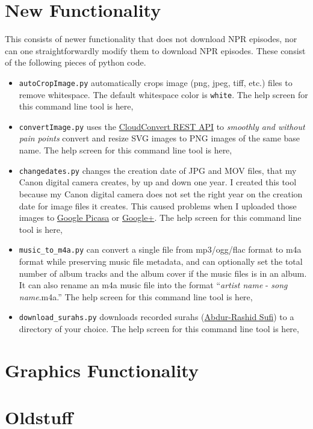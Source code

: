 \documentclass[]{article}
\begin{document}
\section{New Functionality}\label{sec:new_functionality}
This consists of newer functionality that does not download NPR episodes, nor can one straightforwardly modify them to download NPR episodes. These consist of the following pieces of python code.
\begin{itemize}
 \item {\verb|autoCropImage.py|} automatically crops image (png, jpeg, tiff, etc.) files to remove whitespace. The default whitespace color is {\verb|white|}. The help screen for this command line tool is here,
 
 
 \item {\verb|convertImage.py|} uses the \href{https://cloudconvert.com/apiconsole}{CloudConvert REST API} to \textit{smoothly and without pain points} convert and resize SVG images to PNG images of the same base name. The help screen for this command line tool is here,
 
 
 \item {\verb|changedates.py|} changes the creation date of JPG and MOV files, that my Canon digital camera creates, by up and down one year. I created this tool because my Canon digital camera does not set the right year on the creation date for image files it creates. This caused problems when I uploaded those images to \href{https://picasa.google.com/}{Google Picasa} or \href{https://plus.google.com/}{Google+}. The help screen for this command line tool is here,
 
 
 \item {\verb|music_to_m4a.py|} can convert a single file from mp3/ogg/flac format to m4a format while preserving music file metadata, and can optionally set the total number of album tracks and the album cover if the music files is in an album. It can also rename an m4a music file into the format ``\textit{artist name} - \textit{song name}.m4a.'' The help screen for this command line tool is here,
 
 
 \item {\verb|download_surahs.py|} downloads recorded surahs (\href{http://quranicaudio.com/quran/109}{Abdur-Rashid Sufi}) to a directory of your choice. The help screen for this command line tool is here,
 
\end{itemize}

\section{Graphics Functionality}\label{sec:graphics_functionality}

\section{Oldstuff}\label{sec:oldstuff}
\end{document}
